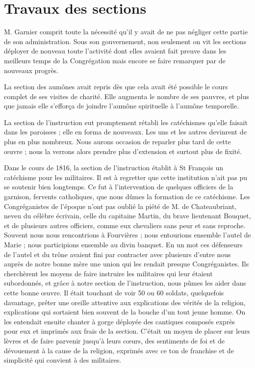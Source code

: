 \section*{Travaux des sections}
M. Garnier comprit toute la nécessité qu'il y avait de ne pas négliger cette partie de son administration. Sous son gouvernement, non seulement on vit les sections déployer de nouveau toute l'activité dont elles avaient fait preuve dans les meilleurs temps de la Congrégation mais encore se faire remarquer par de nouveaux progrès.

La section des aumônes avait repris dès que cela avait été possible le cours complet de ses visites de charité. Elle augmenta le nombre de ses pauvres, et plus que jamais elle s'efforça de joindre l'aumône spirituelle à l'aumône temporelle.

La section de l'instruction eut promptement rétabli les catéchismes qu'elle faisait dans les paroisses ; elle en forma de nouveaux. Les uns et les autres devinrent de plus en plus nombreux. Nous aurons occasion de reparler plus tard de cette œuvre ; nous la verrons alors prendre plus d'extension
et surtout plus de fixité.

Dans le cours de 1816, la section de l'instruction établit à St François un catéchisme pour les militaires. Il est à regretter que cette institution n'ait pas pu se soutenir bien longtemps. Ce fut à l'intervention de quelques officiers de la garnison, fervents catholiques, que nous dûmes la formation de ce catéchisme. Les Congréganistes de l'époque n'ont pas oublié la piété de M. de Chateaubriant, neveu du célèbre écrivain, celle du capitaine Martin, du brave lieutenant Bouquet, et de plusieurs autres officiers, comme eux chevaliers sans peur et sans reproche. Souvent nous nous rencontrions à Fourvières ; nous entourions ensemble l'autel de Marie ; nous participions ensemble au divin banquet. En un mot ces défenseurs de l'autel et du trône avaient fini par contracter avec plusieurs d'entre nous auprès de notre bonne mère une union qui les rendait presque Congréganistes. Ils cherchèrent les moyens de faire instruire les militaires qui leur étaient subordonnés, et grâce à notre section de l'instruction, nous pûmes les aider dans cette bonne œuvre. Il était touchant de voir 50 ou 60 soldats, quelquefois davantage, prêter une oreille attentive aux explications des vérités de la religion, explications qui sortaient bien souvent de la bouche d'un tout jeune homme. On les entendait ensuite chanter à gorge déployée des cantiques composés exprès pour eux et imprimés aux frais de la section. C'était un moyen de placer sur leurs lèvres et de faire parvenir jusqu'à leurs cœurs, des sentiments de foi et de dévouement à la cause de la religion, exprimés
avec ce ton de franchise et de simplicité qui convient à des militaires.

